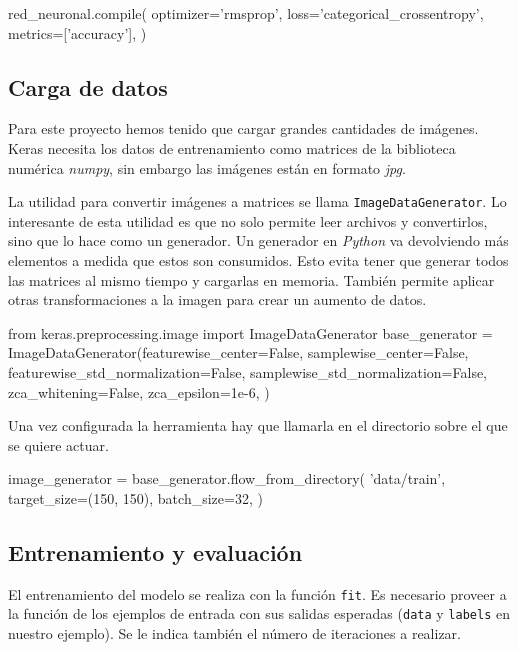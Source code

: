 \begin{python}
red_neuronal.compile(
    optimizer='rmsprop',
    loss='categorical_crossentropy',
    metrics=['accuracy'],
)
\end{python}

\subsection{Carga de datos}

Para este proyecto hemos tenido que cargar grandes cantidades de imágenes.
Keras necesita los datos de entrenamiento como matrices de la biblioteca
numérica \textit{numpy}, sin embargo las imágenes están en formato
\textit{jpg}.

La utilidad para convertir imágenes a matrices se llama
\texttt{ImageDataGenerator}. Lo interesante de esta utilidad es que no solo
permite leer archivos y convertirlos, sino que lo hace como un generador. Un
generador en \textit{Python} va devolviendo más elementos a medida que estos son
consumidos. Esto evita tener que generar todos las matrices al mismo tiempo y
cargarlas en memoria. También permite aplicar otras transformaciones a la
imagen para crear un aumento de datos.

\begin{python}
from keras.preprocessing.image import ImageDataGenerator
base_generator = ImageDataGenerator(featurewise_center=False,
    samplewise_center=False,
    featurewise_std_normalization=False,
    samplewise_std_normalization=False,
    zca_whitening=False,
    zca_epsilon=1e-6,
)
\end{python}

Una vez configurada la herramienta hay que llamarla en el directorio sobre el que se quiere actuar.

\begin{python}
image_generator = base_generator.flow_from_directory(
    'data/train',
    target_size=(150, 150),
    batch_size=32,
)
\end{python}

\subsection{Entrenamiento y evaluación}

El entrenamiento del modelo se realiza con la función \texttt{fit}. Es
necesario proveer a la función de los ejemplos de entrada con sus salidas
esperadas (\texttt{data} y \texttt{labels} en nuestro ejemplo). Se le indica
también el número de iteraciones a realizar.

